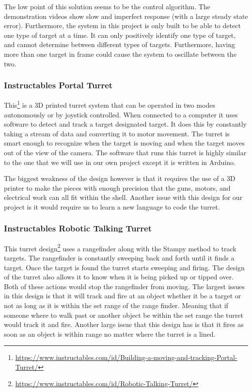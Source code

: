 The low point of this solution seems to be the control algorithm. The demonstration videos show slow and imperfect response (with a large steady state error). Furthermore, the system in this project is only built to be able to detect one type of target at a time. It can only positively identify one type of target, and cannot determine between different types of targets. Furthermore, having more than one target in frame could cause the system to oscillate between the two.

\subsubsection{Instructables Portal Turret}
This\footnote{\url{https://www.instructables.com/id/Building-a-moving-and-tracking-Portal-Turret/}} is a 3D printed turret system that can be operated in two modes autonomously or by joystick controlled. When connected to a computer it uses software to detect and track a target designated target. It does this by constantly taking a stream of data and converting it to motor movement. The turret is smart enough to recognize when the target is moving and when the target moves out of the view of the camera.  The software that runs this turret is highly similar to the one that we will use in our own project except it is written in Arduino. 

The biggest weakness of the design however is that it requires the use of a 3D printer to make the pieces with enough precision that the guns, motors, and  electrical work can all fit within the shell. Another issue with this design for our project is it would require us to learn a new language to code the turret.  

\subsubsection{Instructables Robotic Talking Turret}
This turret design\footnote{\url{https://www.instructables.com/id/Robotic-Talking-Turret/}} uses a rangefinder along with the Stampy method to track targets. The rangefinder is constantly sweeping back and forth until it finds a target. Once the target is found the turret starts sweeping and firing. The design of the turret also allows it to know when it is being picked up or tipped over. Both of these actions would stop the rangefinder from moving. 
The largest issues in this design is that it will track and fire at an object whether it be a target or not as long as it is within the set range of the range finder. Meaning that if someone where to walk past or another object be within the set range the turret would track it and fire. Another large issue that this design has is that it fires as soon as an object is within range no matter where the turret is a lined.

